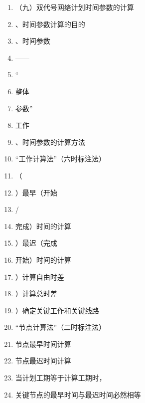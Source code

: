 \documentclass[UTF8,fontset=fandol,11pt]{ctexart}
\begin{document}
\begin{enumerate}[label=\arabic*.]

\item （九）双代号网络计划时间参数的计算

\item 、时间参数计算的目的

\item 、时间参数

\item ——

\item “

\item 整体

\item 参数”

\item 工作

\item 、时间参数的计算方法

\item “工作计算法”（六时标注法）

\item （

\item ）最早（开始

\item /

\item 完成）时间的计算

\item ）最迟（完成

\item 开始）时间的计算

\item ）计算自由时差

\item ）计算总时差

\item ）确定关键工作和关键线路

\item “节点计算法”（二时标注法）

\item 节点最早时间计算

\item 节点最迟时间计算

\item 当计划工期等于计算工期时，

\item 关键节点的最早时间与最迟时间必然相等

\end{enumerate}
\end{document}
